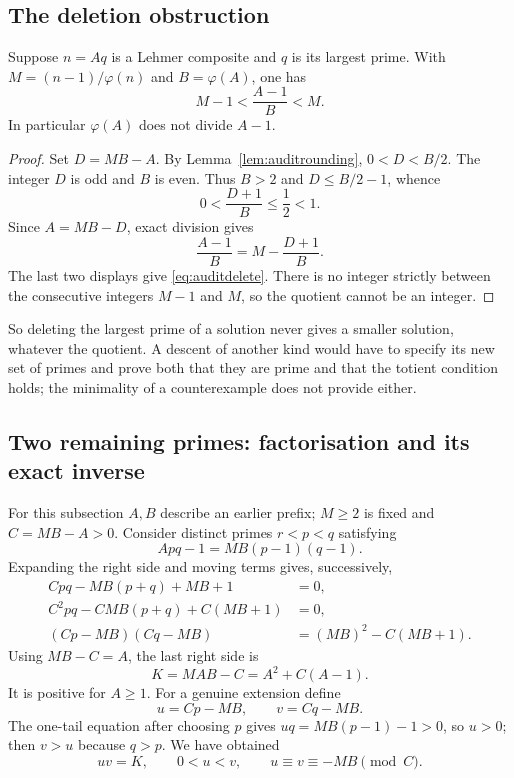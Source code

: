 \subsection{The deletion obstruction}
\begin{proposition}
\label{prop:auditdeletion}
Suppose $n=Aq$ is a Lehmer composite and $q$ is its largest prime.
With $M=(n-1)/\varphi(n)$ and $B=\varphi(A)$, one has
\begin{equation}\label{eq:auditdelete}
 M-1<\frac{A-1}{B}<M.
\end{equation}
In particular $\varphi(A)$ does not divide $A-1$.
\end{proposition}
\begin{proof}
Set $D=MB-A$. By Lemma~\ref{lem:auditrounding}, $0<D<B/2$.
The integer $D$ is odd and $B$ is even. Thus $B>2$ and
$D\le B/2-1$, whence
\[
 0<\frac{D+1}{B}\le\frac12<1.
\]
Since $A=MB-D$, exact division gives
\[
 \frac{A-1}{B}=M-\frac{D+1}{B}.
\]
The last two displays give \eqref{eq:auditdelete}. There is no
integer strictly between the consecutive integers $M-1$ and $M$,
so the quotient cannot be an integer.
\end{proof}

So deleting the largest prime of a solution never gives a smaller
solution, whatever the quotient. A descent of another kind would have
to specify its new set of primes and prove both that they are prime and
that the totient condition holds; the minimality of a counterexample
does not provide either.

\subsection{Two remaining primes: factorisation and its exact inverse}
For this subsection $A,B$ describe an earlier prefix; $M\ge2$ is
fixed and $C=MB-A>0$. Consider distinct primes $r<p<q$ satisfying
\begin{equation}\label{eq:audittwotarget}
 Apq-1=MB(p-1)(q-1).
\end{equation}
Expanding the right side and moving terms gives, successively,
\begin{align*}
 Cpq-MB(p+q)+MB+1&=0,\\
 C^2pq-CMB(p+q)+C(MB+1)&=0,\\
 (Cp-MB)(Cq-MB)&=(MB)^2-C(MB+1).
\end{align*}
Using $MB-C=A$, the last right side is
\begin{equation}\label{eq:auditK}
 K=MAB-C=A^2+C(A-1).
\end{equation}
It is positive for $A\ge1$. For a genuine extension define
\begin{equation}\label{eq:audituv}
 u=Cp-MB,\qquad v=Cq-MB.
\end{equation}
The one-tail equation after choosing $p$ gives
$uq=MB(p-1)-1>0$, so $u>0$; then $v>u$ because $q>p$.
We have obtained
\begin{equation}\label{eq:auditfactorpair}
 uv=K,\qquad 0<u<v,\qquad u\equiv v\equiv-MB\pmod C.
\end{equation}

